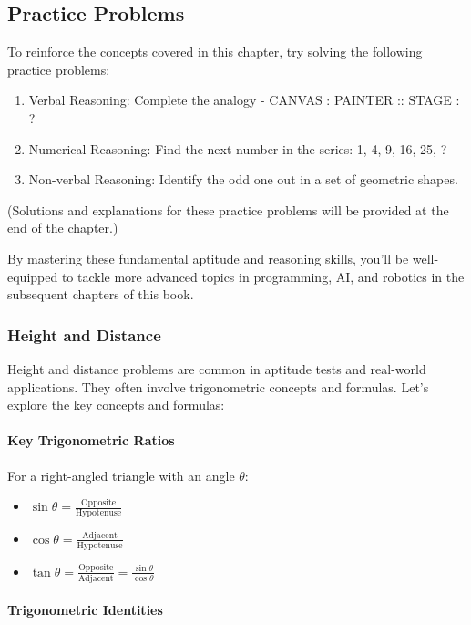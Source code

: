 \subsection{Practice Problems}

To reinforce the concepts covered in this chapter, try solving the
following practice problems:

\begin{enumerate}
    \item Verbal Reasoning: Complete the analogy - CANVAS : PAINTER :: STAGE : ?
    \item Numerical Reasoning: Find the next number in the series: 1, 4, 9, 16, 25, ?
    \item Non-verbal Reasoning: Identify the odd one out in a set of geometric shapes.
\end{enumerate}

(Solutions and explanations for these practice problems will be provided
at the end of the chapter.)

By mastering these fundamental aptitude and reasoning skills, you'll be
well-equipped to tackle more advanced topics in programming, AI, and
robotics in the subsequent chapters of this book.

\subsubsection{Height and Distance}

Height and distance problems are common in aptitude tests and real-world
applications. They often involve trigonometric concepts and formulas.
Let's explore the key concepts and formulas:

\paragraph{Key Trigonometric Ratios}

For a right-angled triangle with an angle $\theta$:

\begin{itemize}
    \item $\sin \theta = \frac{\text{Opposite}}{\text{Hypotenuse}}$
    \item $\cos \theta = \frac{\text{Adjacent}}{\text{Hypotenuse}}$
    \item $\tan \theta = \frac{\text{Opposite}}{\text{Adjacent}} = \frac{\sin \theta}{\cos \theta}$
\end{itemize}

\paragraph{Trigonometric Identities}

